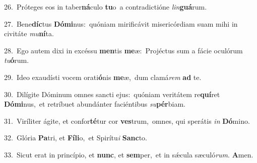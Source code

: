 {\numbfont\textcolor{\numbcolor}{26.}}~Próteges eos in taber\-\textbf{ná}\-culo \textbf{tu}\-o~\star a contradictióne \textit{lin}\-\textbf{guá}rum.\par
{\numbfont\textcolor{\numbcolor}{27.}}~Bene\-\textbf{díc}\-tus \textbf{Dó}\-\textbf{mi}nus:~\star quóniam mirificávit misericórdiam suam mihi in civitáte \textit{mu}\-\textbf{ní}ta.\par
{\numbfont\textcolor{\numbcolor}{28.}}~Ego autem dixi in excéssu \textbf{men}\-tis \textbf{me}\-æ:~\star Projéctus sum a fácie oculórum \textit{tu}\-\textbf{ó}rum.\par
{\numbfont\textcolor{\numbcolor}{29.}}~Ideo exaudísti vocem orati\-\textbf{ó}\-nis \textbf{me}\-æ,~\star dum clamá\textit{rem} \textbf{ad} te.\par
{\numbfont\textcolor{\numbcolor}{30.}}~Dilígite Dóminum omnes sancti ejus:~\dagger quóniam veritátem re\-\textbf{quí}\-ret \textbf{Dó}\-\textbf{mi}nus,~\star et retríbuet abundánter faciéntibus \textit{su}\-\textbf{pér}biam.\par
{\numbfont\textcolor{\numbcolor}{31.}}~Viríliter ágite, et confor\-\textbf{té}\-tur cor \textbf{ves}\-trum,~\star omnes, qui sperátis \textit{in} \textbf{Dó}\-mino.\par
{\numbfont\textcolor{\numbcolor}{32.}}~Glória \textbf{Pa}\-tri, et \textbf{Fí}\-\textbf{li}o,~\star et Spirítu\textit{i} \textbf{Sanc}\-to.\par
{\numbfont\textcolor{\numbcolor}{33.}}~Sicut erat in princípio, et \textbf{nunc}\-, et \textbf{sem}\-per,~\star et in sǽcula sæculó\-\textit{rum}\-. \textbf{A}\-men.\par
